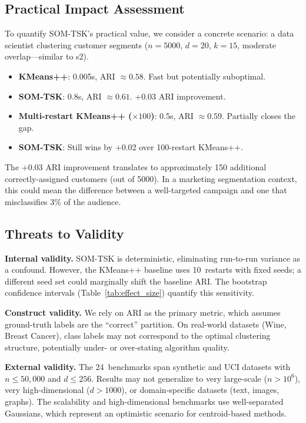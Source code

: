 \documentclass[journal]{IEEEtran}
\begin{document}
\subsection{Practical Impact Assessment}

To quantify SOM-TSK's practical value, we consider a concrete scenario: a data scientist clustering customer segments ($n = 5000$, $d = 20$, $k = 15$, moderate overlap---similar to s2).

\begin{itemize}
  \item \textbf{KMeans++}: 0.005s, ARI $\approx 0.58$. Fast but potentially suboptimal.
  \item \textbf{SOM-TSK}: 0.8s, ARI $\approx 0.61$. +0.03 ARI improvement.
  \item \textbf{Multi-restart KMeans++ ($\times 100$)}: 0.5s, ARI $\approx 0.59$. Partially closes the gap.
  \item \textbf{SOM-TSK}: Still wins by +0.02 over 100-restart KMeans++.
\end{itemize}

The +0.03 ARI improvement translates to approximately 150 additional correctly-assigned customers (out of 5000). In a marketing segmentation context, this could mean the difference between a well-targeted campaign and one that misclassifies 3\% of the audience.

\subsection{Threats to Validity}
\label{sec:threats}

\textbf{Internal validity.}
SOM-TSK is deterministic, eliminating run-to-run variance as a confound.
However, the KMeans++ baseline uses 10~restarts with fixed seeds; a different seed set could marginally shift the baseline ARI.
The bootstrap confidence intervals (Table~\ref{tab:effect_size}) quantify this sensitivity.

\textbf{Construct validity.}
We rely on ARI as the primary metric, which assumes ground-truth labels are the ``correct'' partition.
On real-world datasets (Wine, Breast Cancer), class labels may not correspond to the optimal clustering structure, potentially under- or over-stating algorithm quality.

\textbf{External validity.}
The 24~benchmarks span synthetic and UCI datasets with $n \le 50{,}000$ and $d \le 256$.
Results may not generalize to very large-scale ($n > 10^6$), very high-dimensional ($d > 1000$), or domain-specific datasets (text, images, graphs).
The scalability and high-dimensional benchmarks use well-separated Gaussians, which represent an optimistic scenario for centroid-based methods.
\end{document}
